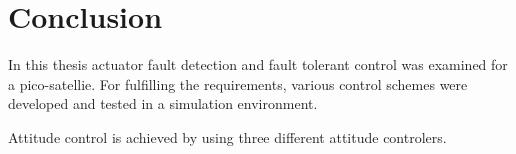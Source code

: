\chapter{Conclusion}
In this thesis actuator fault detection and fault tolerant control was examined for a pico-satellie. For fulfilling the requirements, various control schemes were developed and tested in a simulation environment.

Attitude control is achieved by using three different attitude controlers. 

